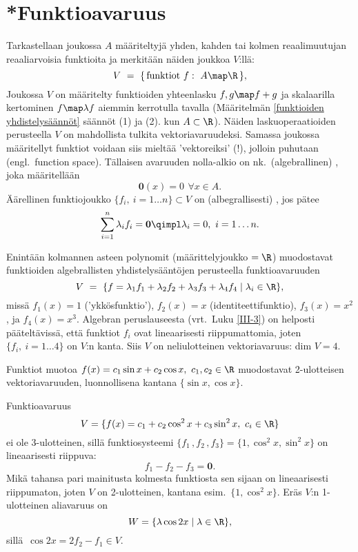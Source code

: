 \section{*Funktioavaruus} \label{funktioavaruus}
\alku

Tarkastellaan  joukossa $A$ määriteltyjä yhden, kahden tai kolmen reaalimuutujan
reaaliarvoisia funktioita ja merkitään näiden joukkoa $V$:llä:
\[ 
V\ =\ \{\,\text{funktiot}\ f:\ A \map \R\,\}, 
\]
Joukossa $V$ on määritelty funktioiden yhteenlasku $f,g \map f+g$ ja skalaarilla kertominen
$f \map \lambda f$ aiemmin kerrotulla tavalla (Määritelmän \ref{funktioiden yhdistelysäännöt}
säännöt (1) ja (2). kun $A \subset \R$). Näiden laskuoperaatioiden perusteella $V$ on
mahdollista tulkita vektoriavaruudeksi. Samassa joukossa määritellyt funktiot voidaan siis 
mieltää 'vektoreiksi' (!), jolloin puhutaan  (engl.\ function space). 
Tällaisen avaruuden nolla-alkio on nk.\ (algebrallinen) , joka määritellään
\[ 
\mathbf{0}(x) = 0\,\ \forall x \in A .
\]
Äärellinen funktiojoukko $\{ f_i,\ i = 1 \ldots n\} \subset V$ on (albegrallisesti) 
, jos pätee
\[ 
\sum_{i=1}^n \lambda_i f_i = \mathbf{0} \qimpl \lambda_i = 0,\ i = 1 \ldots n. 
\]
\begin{Exa} Enintään kolmannen asteen polynomit (määrittelyjoukko $= \R$) muodostavat 
funktioiden algebrallisten yhdistelysääntöjen perusteella funktioavaruuden
\[
V\ =\ \{ f = \lambda_1 f_1 + \lambda_2 f_2 + \lambda_3 f_3 + \lambda_4 f_4 
                                                                   \mid \lambda_i \in \R \},
\]
missä $f_1(x) = 1$ ('ykkösfunktio'), $f_2(x) = x$ (identiteettifunktio), $f_3(x) = x^2$, ja 
$f_4(x) = x^3$. Algebran peruslauseesta (vrt.\ Luku \ref{III-3}) on helposti pääteltävissä, 
että funktiot $f_i$ ovat lineaarisesti riippumattomia, joten $\{f_i,\ i = 1 \ldots 4\}$ on 
$V$:n kanta. Siis $V$ on neliulotteinen vektoriavaruus: dim $V = 4$. \loppu \end{Exa}
\begin{Exa} Funktiot muotoa $f(x)=c_1\sin x+c_2\cos x,\ c_1,c_2\in\R$ muodostavat 2-ulotteisen
vektoriavaruuden, luonnollisena kantana $\{\sin x,\cos x\}$. \loppu
\end{Exa}
\begin{Exa} Funktioavaruus
\[
V=\{f(x)=c_1+c_2\cos^2 x+c_3\sin^2 x,\ c_i\in\R\}
\]
ei ole 3-ulotteinen, sillä funktiosysteemi $\{f_1\,,f_2\,,f_3\}=\{1,\cos^2 x,\sin^2 x\}$ on 
lineaarisesti riippuva:
\[
f_1-f_2-f_3=\mathbf{0}.
\]
Mikä tahansa pari mainitusta kolmesta funktiosta sen sijaan on lineaarisesti riippumaton,
joten $V$ on 2-ulotteinen, kantana esim.\ $\{1,\cos^2 x\}$. Eräs $V$:n 1-ulotteinen aliavaruus
on
\[
W=\{\lambda\cos 2x \mid \lambda\in\R\},
\]
sillä $\,\cos 2x=2f_2-f_1 \in V$. \loppu
\end{Exa}
